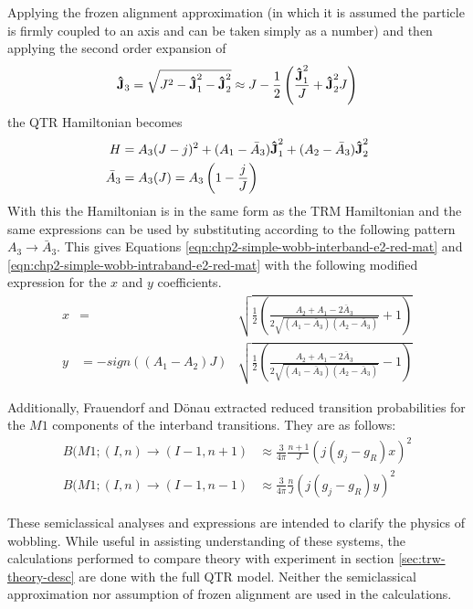 Applying the frozen alignment approximation (in which it is assumed the particle is firmly coupled to an axis and can be taken simply as a number) and then applying the second order expansion of
\begin{equation}
\boldsymbol{\hat{\textbf{J}}}_3=\sqrt{J^2-\boldsymbol{\hat{\textbf{J}}}_1^2-\boldsymbol{\hat{\textbf{J}}}_2^2}\approx{}J-\frac{1}{2}\left(\frac{\boldsymbol{\hat{\textbf{J}}}_1^2}{J}+\boldsymbol{\hat{\textbf{J}}}_2^2{J}\right)
\end{equation}
the QTR Hamiltonian becomes
\begin{align}
H&=A_3(J-j)^2+(A_1-\bar{A}_3)\boldsymbol{\hat{\textbf{J}}}^2_1+(A_2-\bar{A}_3)\boldsymbol{\hat{\textbf{J}}}^2_2\\
\bar{A}_3&=A_3(J)=A_3\left(1-\frac{j}{J}\right)
\end{align}
With this the Hamiltonian is in the same form as the TRM Hamiltonian and the same expressions can be used by substituting according to the following pattern $A_3 \rightarrow\bar{A}_3$. This gives Equations \ref{eqn:chp2-simple-wobb-interband-e2-red-mat} and \ref{eqn:chp2-simple-wobb-intraband-e2-red-mat} with the following modified expression for the $x$ and $y$ coefficients.
\begin{align}
\label{eqn:chp2-simple-wobb-x-y-params-mod}
x&=&\sqrt{\frac{1}{2}\left(\frac{A_2+A_1-2\bar{A}_3}{2\sqrt{(A_1-\bar{A}_3)(A_2-\bar{A}_3)}}+1\right)}\\
y&=-sign((A_1-A_2)J)&\sqrt{\frac{1}{2}\left(\frac{A_2+A_1-2\bar{A}_3}{2\sqrt{(A_1-\bar{A}_3)(A_2-\bar{A}_3)}}-1\right)}\nonumber
\end{align}

Additionally, Frauendorf and D\"onau \cite{frauendorfTransverseWobbling} extracted reduced transition probabilities for the $M1$ components of the interband transitions. They are as follows:
\begin{align}
\label{eqn:chp2-simple-wobb-interband-m1-red-mat}
B(M1;(I,n)\rightarrow(I-1,n+1)&\approx\frac{3}{4\pi}\frac{n+1}{J}\left(j(g_j-g_R)x\right)^2\\
B(M1;(I,n)\rightarrow(I-1,n-1)&\approx\frac{3}{4\pi}\frac{n}{J}\left(j(g_j-g_R)y\right)^2
\end{align}

These semiclassical analyses and expressions are intended to clarify the physics of wobbling. While useful in assisting understanding of these systems, the calculations performed to compare theory with experiment in section \ref{sec:trw-theory-desc} are done with the full QTR model. Neither the semiclassical approximation nor assumption of frozen alignment are used in the calculations.

